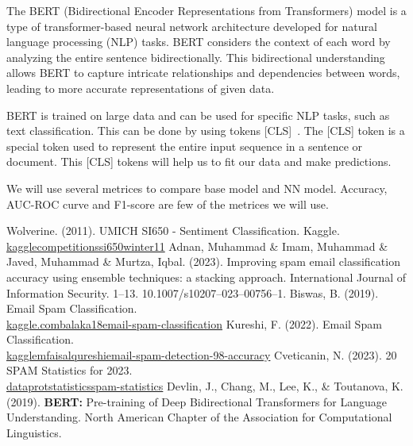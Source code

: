 \documentclass[conference]{IEEEtran}
\begin{document}
The BERT (Bidirectional Encoder Representations from Transformers) model is a type of transformer-based neural network architecture developed for natural language processing (NLP) tasks. BERT considers the context of each word by analyzing the entire sentence bidirectionally. This bidirectional understanding allows BERT to capture intricate relationships and dependencies between words, leading to more accurate representations of given data.

BERT is trained on large data and can be used for specific NLP tasks, such as text classification. This can be done by using tokens [CLS] \cite{bert}. The [CLS] token is a special token used to represent the entire input sequence in a sentence or document. This [CLS] tokens will help us to fit our data and make predictions.

We will use several metrices to compare base model and NN model. Accuracy, AUC-ROC curve and F1-score are few of the metrices we will use.

\begin{thebibliography}{00}
     Wolverine. (2011). UMICH SI650 - Sentiment Classification. Kaggle.\\\href{https://kaggle.com/competitions/si650winter11}{kaggle\textrightarrow competitions\textrightarrow si650winter11}
     Adnan, Muhammad \& Imam, Muhammad \& Javed, Muhammad \& Murtza, Iqbal. (2023). Improving spam email classification accuracy using ensemble techniques: a stacking approach. International Journal of Information Security. 1--13. 10.1007/s10207--023--00756--1. 
     Biswas, B. (2019). Email Spam Classification.\\\href{https://www.kaggle.com/code/balaka18/email-spam-classification}{kaggle.com\textrightarrow balaka18\textrightarrow email-spam-classification}
     Kureshi, F. (2022). Email Spam Classification.\\\href{https://www.kaggle.com/code/mfaisalqureshi/email-spam-detection-98-accuracy}{kaggle\textrightarrow mfaisalqureshi\textrightarrow email-spam-detection-98-accuracy}
     Cveticanin, N. (2023). 20 SPAM Statistics for 2023.\\\href{https://dataprot.net/statistics/spam-statistics/}{dataprot\textrightarrow statistics\textrightarrow spam-statistics}
     Devlin, J., Chang, M., Lee, K., \& Toutanova, K. (2019). \textbf{BERT:} Pre-training of Deep Bidirectional Transformers for Language Understanding. North American Chapter of the Association for Computational Linguistics.
\end{thebibliography}
\end{document}
